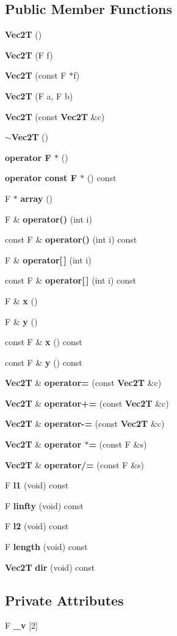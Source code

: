 \subsection*{Public Member Functions}
\begin{CompactItemize}
\item 
{\bf Vec2T} ()
\item 
{\bf Vec2T} (F f)
\item 
{\bf Vec2T} (const F $\ast$f)
\item 
{\bf Vec2T} (F a, F b)
\item 
{\bf Vec2T} (const {\bf Vec2T} \&c)
\item 
{\bf $\sim$Vec2T} ()
\item 
{\bf operator F $\ast$} ()
\item 
{\bf operator const F $\ast$} () const 
\item 
F $\ast$ {\bf array} ()
\item 
F \& {\bf operator()} (int i)
\item 
const F \& {\bf operator()} (int i) const 
\item 
F \& {\bf operator[$\,$]} (int i)
\item 
const F \& {\bf operator[$\,$]} (int i) const 
\item 
F \& {\bf x} ()
\item 
F \& {\bf y} ()
\item 
const F \& {\bf x} () const 
\item 
const F \& {\bf y} () const 
\item 
{\bf Vec2T} \& {\bf operator=} (const {\bf Vec2T} \&c)
\item 
{\bf Vec2T} \& {\bf operator+=} (const {\bf Vec2T} \&c)
\item 
{\bf Vec2T} \& {\bf operator-=} (const {\bf Vec2T} \&c)
\item 
{\bf Vec2T} \& {\bf operator $\ast$=} (const F \&s)
\item 
{\bf Vec2T} \& {\bf operator/=} (const F \&s)
\item 
F {\bf l1} (void) const 
\item 
F {\bf linfty} (void) const 
\item 
F {\bf l2} (void) const 
\item 
F {\bf length} (void) const 
\item 
{\bf Vec2T} {\bf dir} (void) const 
\end{CompactItemize}
\subsection*{Private Attributes}
\begin{CompactItemize}
\item 
F {\bf \_\-v} [2]
\end{CompactItemize}


